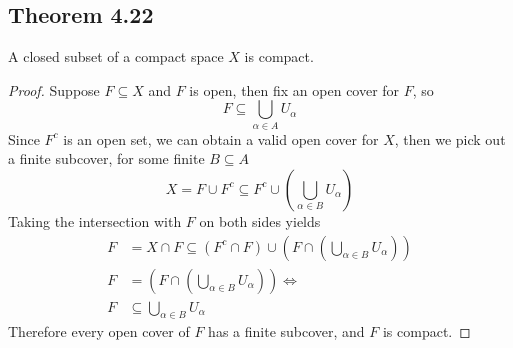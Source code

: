 \documentclass[../../main.tex]{subfiles}
\begin{document}
\subsection{Theorem 4.22}
\begin{wts}
A closed subset of a compact space $X$ is compact.
\end{wts}
\begin{proof}
Suppose $F\subseteq X$ and $F$ is open, then fix an open cover for $F$, so
\[
F\subseteq \bigcup_{\alpha\in A}U_\alpha
\]
Since $F^c$ is an open set, we can obtain a valid open cover for $X$, then we pick out a finite subcover, for some finite $B\subseteq A$
\[
X = F\cup F^c \subseteq F^c\cup \left(\bigcup_{\alpha\in B}U_\alpha\right)
\]
Taking the intersection with $F$ on both sides yields
\begin{align*}
    F &= X\cap F \subseteq (F^c\cap F)\cup \left(F\cap\left(\bigcup_{\alpha\in B}U_\alpha\right)\right)\\
    F &= \left(F\cap\left(\bigcup_{\alpha\in B}U_\alpha\right)\right)\iff\\
    F&\subseteq \bigcup_{\alpha\in B}U_\alpha
\end{align*}
Therefore every open cover of $F$ has a finite subcover, and $F$ is compact.
\end{proof}
\end{document}
